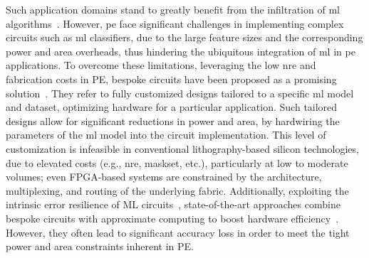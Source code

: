 Such application domains stand to greatly benefit from the infiltration of \gls{ml} algorithms~\cite{Mubarik:MICRO:2020:printedml}.
However, \gls{pe} face significant challenges in implementing complex circuits such as \gls{ml} classifiers, due to the large feature sizes and the corresponding power and area overheads, thus hindering the ubiquitous integration of \gls{ml} in \gls{pe} applications.
To overcome these limitations, leveraging the low \gls{nre} and fabrication costs in PE, bespoke circuits have been proposed as a promising solution~\cite{Mubarik:MICRO:2020:printedml}.
They refer to fully customized designs tailored to a specific \gls{ml} model and dataset, optimizing hardware for a particular application.
Such tailored designs allow for significant reductions in power and area, by hardwiring the parameters of the \gls{ml} model into the circuit implementation.
This level of customization is infeasible in conventional lithography-based silicon technologies, due to elevated costs (e.g., \gls{nre}, maskset, etc.), particularly at low to moderate volumes;
even FPGA-based systems are constrained by the architecture, multiplexing, and routing of the underlying fabric.
Additionally, exploiting the intrinsic error resilience of ML circuits~\cite{Henkel:ICCAD2022:expedition}, state-of-the-art approaches combine bespoke circuits with approximate computing to boost hardware efficiency~\cite{Armeniakos:DATE2022:axml,Armeniakos:TCAD2023:cross,Armeniakos:TC2023:codesign,Afentaki:ICCAD23:hollistic,Afentaki:DATE2024:embedding,Mrazek:ICCAD2024}.
However, they often lead to significant accuracy loss in order to meet the tight power and area constraints inherent in PE. 

